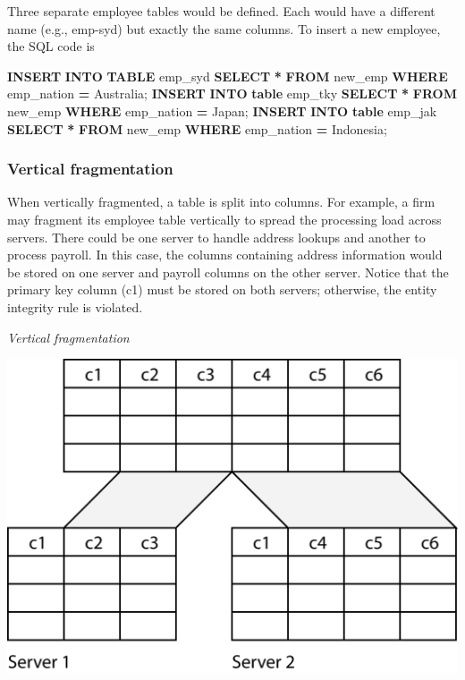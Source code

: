 \documentclass[
]{article}
\newenvironment{Shaded}{\begin{snugshade}}{\end{snugshade}}
\newcommand{\KeywordTok}[1]{\textcolor[rgb]{0.13,0.29,0.53}{\textbf{#1}}}
\newcommand{\NormalTok}[1]{#1}
\newcommand{\OperatorTok}[1]{\textcolor[rgb]{0.81,0.36,0.00}{\textbf{#1}}}
\newcommand{\StringTok}[1]{\textcolor[rgb]{0.31,0.60,0.02}{#1}}
\begin{document}
Three separate employee tables would be defined. Each would have a
different name (e.g., emp-syd) but exactly the same columns. To insert a
new employee, the SQL code is

\begin{Shaded}
\begin{Highlighting}[]
\KeywordTok{INSERT} \KeywordTok{INTO} \KeywordTok{TABLE}\NormalTok{ emp\_syd}
    \KeywordTok{SELECT} \OperatorTok{*} \KeywordTok{FROM}\NormalTok{ new\_emp}
        \KeywordTok{WHERE}\NormalTok{ emp\_nation }\OperatorTok{=} \StringTok{\textquotesingle{}Australia\textquotesingle{}}\NormalTok{;}
\KeywordTok{INSERT} \KeywordTok{INTO} \KeywordTok{table}\NormalTok{ emp\_tky}
    \KeywordTok{SELECT} \OperatorTok{*} \KeywordTok{FROM}\NormalTok{ new\_emp}
        \KeywordTok{WHERE}\NormalTok{ emp\_nation }\OperatorTok{=} \StringTok{\textquotesingle{}Japan\textquotesingle{}}\NormalTok{;}
\KeywordTok{INSERT} \KeywordTok{INTO} \KeywordTok{table}\NormalTok{ emp\_jak}
    \KeywordTok{SELECT} \OperatorTok{*} \KeywordTok{FROM}\NormalTok{ new\_emp}
        \KeywordTok{WHERE}\NormalTok{ emp\_nation }\OperatorTok{=} \StringTok{\textquotesingle{}Indonesia\textquotesingle{}}\NormalTok{;}
\end{Highlighting}
\end{Shaded}

\hypertarget{vertical-fragmentation}{%
\subsubsection*{Vertical fragmentation}\label{vertical-fragmentation}}

When vertically fragmented, a table is split into columns. For example,
a firm may fragment its employee table vertically to spread the
processing load across servers. There could be one server to handle
address lookups and another to process payroll. In this case, the
columns containing address information would be stored on one server and
payroll columns on the other server. Notice that the primary key column
(c1) must be stored on both servers; otherwise, the entity integrity
rule is violated.

\emph{Vertical fragmentation}

\includegraphics{Figures/Chapter 21/frag-vertical.png}
\end{document}
